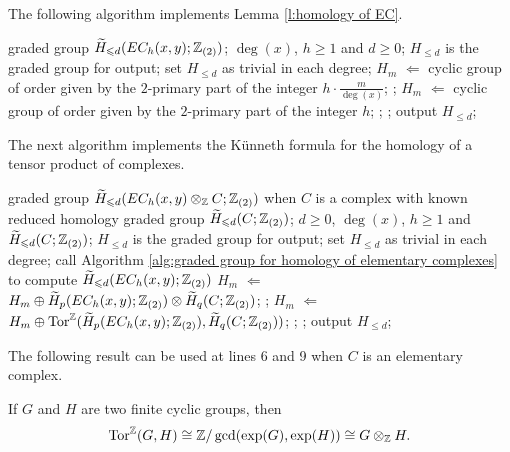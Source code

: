 The following algorithm implements Lemma \ref{l:homology of EC}.

\begin{alg}\label{alg:graded group for homology of elementary complexes}
\begin{algorithmic}[1]
\ENSURE graded group $\widetilde{H}_{\leqslant d}(EC_{h}(x,y);\mathbb{Z}_{(2)})$;
\REQUIRE $\deg(x)$, $h\geq1$ and $d\geq0$;
\STATE $H_{\leq d}$ is the graded group for output;
\STATE set $H_{\leq d}$ as trivial in each degree;
\STATE $H_m$ $\Leftarrow$ cyclic group of order given by the $2$-primary part of the integer $h\cdot\frac{m}{\deg(x)}$;
\ENDIF;
\STATE $H_m$ $\Leftarrow$ cyclic group of order given by the $2$-primary part of the integer $h$;
\ENDIF;
\ENDFOR;
\STATE output $H_{\leq d}$;
\end{algorithmic}
\end{alg}

The next algorithm implements the K\"unneth formula for the homology of a tensor product of complexes. 

\begin{alg}\label{alg:Kunneth}
\begin{algorithmic}[1]
\ENSURE graded group $\widetilde{H}_{\leqslant d}(EC_{h}(x,y)\otimes_{\mathbb{Z}} C;\mathbb{Z}_{(2)})$ when $C$ is a complex with known reduced homology graded group $\widetilde{H}_{\leqslant d}(C;\mathbb{Z}_{(2)})$;
\REQUIRE $d\geq0$, $\deg(x)$, $h\geq1$ and $\widetilde{H}_{\leqslant d}(C;\mathbb{Z}_{(2)})$;
\STATE $H_{\leq d}$ is the graded group for output;
\STATE set $H_{\leq d}$ as trivial in each degree;
\STATE call Algorithm \ref{alg:graded group for homology of elementary complexes} to compute $\widetilde{H}_{\leqslant d}(EC_{h}(x,y);\mathbb{Z}_{(2)})$
\STATE $H_m$ $\Leftarrow$ $H_m\oplus\widetilde{H}_p(EC_{h}(x,y);\mathbb{Z}_{(2)})\otimes\widetilde{H}_q(C;\mathbb{Z}_{(2)})$;
\ENDFOR;
\STATE $H_m$ $\Leftarrow$ $H_m\oplus\operatorname{Tor}^{\mathbb{Z}}(\widetilde{H}_p(EC_{h}(x,y);\mathbb{Z}_{(2)}),\widetilde{H}_q(C;\mathbb{Z}_{(2)}))$;
\ENDFOR;
\ENDFOR;
\STATE output $H_{\leq d}$;
\end{algorithmic}
\end{alg}

The following result can be used at lines 6 and 9 when $C$ is an elementary complex.

\begin{lem}
If $G$ and $H$ are two finite cyclic groups, then
$$
\operatorname{Tor}^{\mathbb{Z}}(G,H)\cong\mathbb{Z}/\gcd(\exp(G),\exp(H))\cong G\otimes_{\mathbb{Z}} H.
$$
\end{lem}

